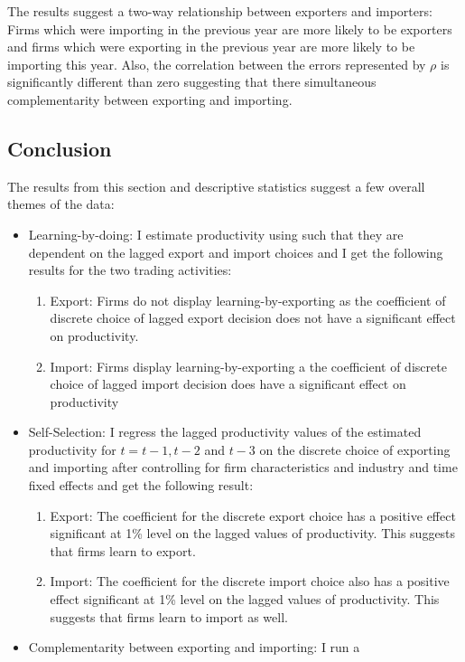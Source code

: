 \documentclass[11pt]{article}
\begin{document}
The results suggest a two-way relationship between exporters and
  importers: Firms which were importing in the previous year are more
  likely to be exporters and firms which were exporting in the
  previous year are more likely to be importing this year. Also, the
  correlation between the errors represented by $\rho$ is
  significantly different than zero suggesting that there simultaneous
  complementarity between exporting and importing.
\subsection{Conclusion}

The results from this section and descriptive statistics suggest a few
overall themes of the data: 
\begin{itemize}
\item Learning-by-doing: I estimate productivity using
  \cite{levinsohn2003estimating} such that they are dependent on the
  lagged export and import choices and I get the following results for
  the two trading activities:
\begin{enumerate}
\item Export: Firms do not display learning-by-exporting as the
  coefficient of discrete choice of lagged export decision does not
  have a significant effect on productivity. 
\item Import: Firms display learning-by-exporting a the
  coefficient of discrete choice of lagged import decision does
  have a significant effect on productivity 
\end{enumerate}
\item Self-Selection: I regress the lagged productivity values of the
  estimated productivity for $t= t-1,t-2$ and $t-3$ on the discrete choice
  of exporting and importing after controlling for firm
  characteristics and industry and time fixed effects and get the
  following result:
\begin{enumerate}
\item Export: The coefficient for the discrete export choice has a
  positive effect significant at 1\% level on the lagged values of
  productivity. This suggests that firms learn to export.  
\item Import:  The coefficient for the discrete import choice also has a
  positive effect significant at 1\% level on the lagged values of
  productivity. This suggests that firms learn to import as well. 
\end{enumerate} 
\item Complementarity between exporting and importing: I run a

\end{itemize}
\end{document}
